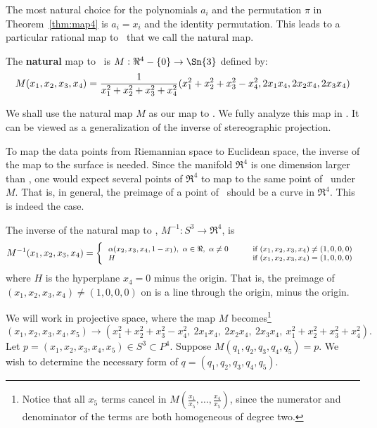 \noindent The most natural choice for the polynomials $a_i$ and the permutation $\pi$ 
in Theorem~\ref{thm:map4} is $a_i = x_i$ and the identity permutation.
This leads to a particular rational map to \ that we call the natural map.
%
\begin{defn2}
The {\bf natural} map to \ is 
$M: \Re^4 - \{0\} \rightarrow \Sn{3}$ defined by:
\begin{equation}
\label{eqM}
\footnotesize{
	M(x_1,x_2,x_3,x_4) =
	\frac{1}{x_1^2 + x_2^2 + x_3^2 + x_4^2}
	(x_1^2 + x_2^2 + x_3^2 - x_4^2, 2x_1x_4, 2x_2x_4, 2x_3x_4)
	 }
\end{equation}
\end{defn2}
%
We shall use the natural map $M$ as our map to .
We fully analyze this map in \cite{jj98b}.
It can be viewed as a generalization of the inverse of stereographic projection.

To map the data points from Riemannian space to Euclidean space,
the inverse of the map to the surface is needed.
Since the manifold $\Re^4$ is one dimension larger than , one would expect
several points of $\Re^4$ to map to the same point of \ under $M$.
That is, in general, the preimage of a point of \ should be a curve in $\Re^4$.
This is indeed the case.

\begin{theorem}
\label{thm:inverse}
The inverse of the natural map to , $M^{-1}: S^3 \rightarrow \Re^4$, is
\[ 
\footnotesize{
	M^{-1}(x_1,x_2,x_3,x_4) =
	\left\{ 
	\begin{tabular}{ll}
		$\alpha(x_2,x_3,x_4,1-x_1),\ \alpha \in \Re,\ \alpha \neq 0 \hspace{.2in}$
		  & $\mbox{if } (x_1,x_2,x_3,x_4) \neq (1,0,0,0)$\\
		$H$ & $\mbox{if } (x_1,x_2,x_3,x_4) = (1,0,0,0)$
	\end{tabular}
	\right.
}
\]
where $H$ is the hyperplane $x_4 = 0$ minus the origin.
That is, the preimage of $(x_1,x_2,x_3,x_4) \neq (1,0,0,0)$ on 
is a line through the origin, minus the origin.
\end{theorem}
\prf 
We will work in projective space, where the map $M$ becomes\footnote{Notice 
    that all $x_5$ terms cancel in $M(\frac{x_1}{x_5},\ldots,\frac{x_4}{x_5})$,
    since the numerator and denominator of the terms are both homogeneous of 
    degree two.}
\begin{equation}
\label{eq:proj}
	 (x_1,x_2,x_3,x_4,x_5) \rightarrow
	 (x_1^2 + x_2^2 + x_3^2 - x_4^2,\ 
	 2x_1 x_4,\ 2x_2 x_4,\ 2x_3 x_4,\ 
	 x_1^2 + x_2^2 + x_3^2 + x_4^2).
\end{equation}
Let $p = (x_1,x_2,x_3,x_4,x_5) \in S^3 \subset P^4$.
Suppose $M(q_1,q_2,q_3,q_4,q_5) = p$.
We wish to determine the necessary form of $q = (q_1,q_2,q_3,q_4,q_5)$.

